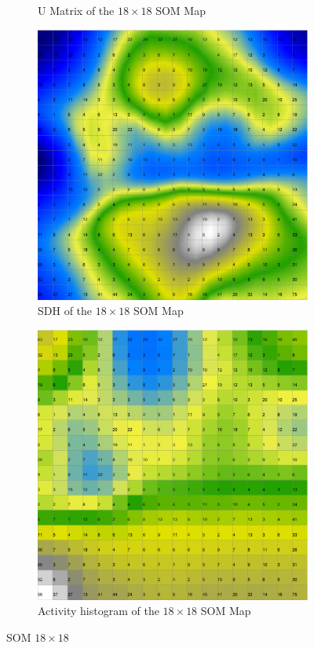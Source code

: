 \documentclass{acm_proc_article-sp}
\begin{document}
\begin{figure}
\begin{subfigure}[b]{0.45\linewidth}
    \caption{U Matrix of the $18\times18$ SOM Map}
    \label{fig:wine-mid-u-matrix}
\end{subfigure}
\begin{subfigure}[b]{0.45\linewidth}
    \includegraphics[width=\linewidth]{img/wine-mid-smoothed-data-histogram}
    \caption{SDH of the $18\times18$ SOM Map}
    \label{fig:wine-mid-smoothed-data-histogram}
\end{subfigure}
\begin{subfigure}[b]{0.45\linewidth}
    \includegraphics[width=\linewidth]{img/wine-mid-activity-histogram}
    \caption{Activity histogram of the $18\times18$ SOM Map}
    \label{fig:wine-mid-activity-histogram}
\end{subfigure}
\caption{SOM $18\times18$}
\end{figure}
\end{document}
